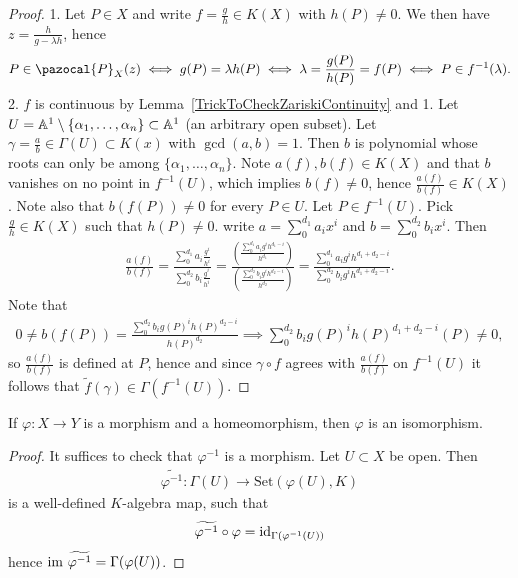     \begin{proof}
        1. Let $P\in X$ and write $f=\frac{g}{h}\in K(X)$ with $h(P)\neq 0$. We then have $z= \frac{h}{g-\lambda h}$, hence 
        \begin{align*}
            P\in \pazocal{P}_X(z) \iff g(P)=\lambda h(P) \iff \lambda= \frac{g(P)}{h(P)}=f(P) \iff P\in f^{-1}(\lambda).
        \end{align*}
        2. $f$ is continuous by Lemma~\ref{TrickToCheckZariskiContinuity} and 1. Let $U=\mathbb{A}^1\setminus\{\alpha_1,\dots,\alpha_n\}\subset \mathbb{A}^1$ (an arbitrary open subset).
        Let $\gamma= \frac{a}{b}\in \Gamma(U)\subset K(x)$ with $\gcd(a,b)=1$. Then $b$ is polynomial whose roots can only be among $\{\alpha_1,\dots, \alpha_n\}$. Note $a(f),b(f)\in K(X)$ and that $b$ vanishes on no point in $f^{-1}(U)$, which implies $b(f)\neq 0$, hence $\frac{a(f)}{b(f)}\in K(X)$. Note also that $b(f(P))\neq 0$ for every $P\in U$. Let $P\in f^{-1}(U)$. Pick $\frac{g}{h}\in K(X)$ such that $h(P)\neq 0$. write $a=\sum_0^{d_1} a_ix^i$ and $b=\sum_0^{d_2} b_i x^i$. Then 
        \begin{align*}
            \frac{a(f)}{b(f)}= \frac{\sum_0^{d_1} a_i\frac{g^i}{h^i}}{\sum_0^{d_2}b_i\frac{g^i}{h^i}} = \frac{\left(\frac{\sum_0^{d_1}a_ig^ih^{d_1-i}}{h^{d_1}}\right)}{\left(\frac{\sum_0^{d_2}b_ig^ih^{d_2-i}}{h^{d_2}}\right)} = \frac{\sum_0^{d_1} a_ig^{i}h^{d_1+d_2-i}}{\sum_0^{d_2}b_ig^ih^{d_1+d_2-i}}.
        \end{align*} 
        Note that  
        \begin{align*}
            0\neq b(f(P)) = \frac{\sum_0^{d_2} b_i g(P)^i h(P)^{d_2-i}}{h(P)^{d_2}} \implies \sum_0^{d_2} b_i g(P)^i h(P)^{d_1+d_2-i}(P)\neq 0, 
        \end{align*}
        so $\frac{a(f)}{b(f)}$ is defined at $P$, hence and since $\gamma\circ f$ agrees with $\frac{a(f)}{b(f)}$ on $f^{-1}(U)$ it follows that $\widetilde{f}(\gamma)\in \Gamma(f^{-1}(U))$.   
    \end{proof}
    \begin{lemma}
        If $\varphi:X\rightarrow Y$ is a morphism and a homeomorphism, then $\varphi$ is an isomorphism. 
    \end{lemma}
    \begin{proof}
        It suffices to check that $\varphi^{-1}$ is a morphism. Let $U\subset X$ be open. Then 
        \begin{gather*}
            \widetilde{\varphi^{-1}} : \Gamma(U)\rightarrow \mathrm{Set}(\varphi(U),K)
        \end{gather*}
        is a well-defined $K$-algebra map, such that 
        $$
            \widetilde{\varphi^{-1}}\circ \varphi = \mathrm{id}_{\Gamma(\varphi^{-1}(U))}
        $$ 
        hence $\im \ \widetilde{\varphi^{-1}}=\Gamma(\varphi(U))$. 
    \end{proof}
